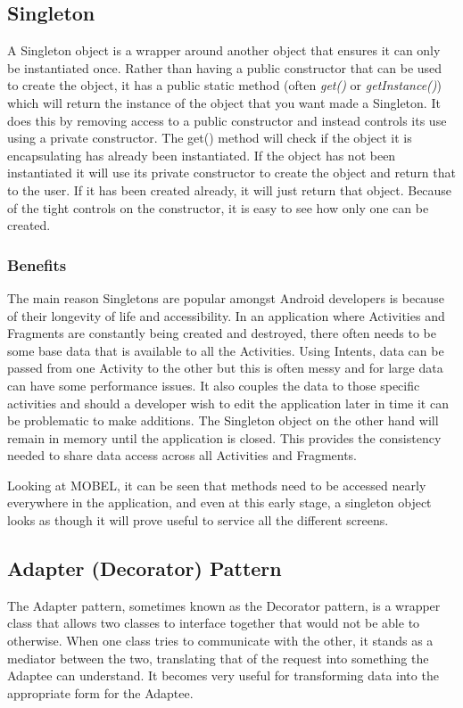\documentclass{l4proj}
\begin{document}
\subsection{Singleton}
A Singleton object is a wrapper around another object that ensures it can only be instantiated once. Rather than having a public constructor that can be used to create the object, it has a public static method (often \textit{get()} or \textit{getInstance()}) which will return the instance of the object that you want made a Singleton.  It does this by removing access to a public constructor and instead controls its use using a private constructor.  The get() method will check if the object it is encapsulating has already been instantiated. If the object has not been instantiated it will use its private constructor to create the object and return that to the user.  If it has been created already, it will just return that object. Because of the tight controls on the constructor, it is easy to see how only one can be created. 

\subsubsection{Benefits}
The main reason Singletons are popular amongst Android developers is because of their longevity of life and accessibility. In an application where Activities and Fragments are constantly being created and destroyed, there often needs to be some base data that is available to all the Activities. Using Intents, data can be passed from one Activity to the other but this is often messy and for large data can have some performance issues.  It also couples the data to those specific activities and should a developer wish to edit the application later in time it can be problematic to make additions.  The Singleton object on the other hand will remain in memory until the application is closed. This provides the consistency needed to share data access across all Activities and Fragments.  

Looking at MOBEL, it can be seen that methods need to be accessed nearly everywhere in the application, and even at this early stage, a singleton object looks as though it will prove useful to service all the different screens. 

\subsection{Adapter (Decorator) Pattern}
The Adapter pattern, sometimes known as the Decorator pattern, is a wrapper class that allows two classes to interface together that would not be able to otherwise. When one class tries to communicate with the other, it stands as a mediator between the two, translating that of the request into something the Adaptee can understand.  It becomes very useful for transforming data into the appropriate form for the Adaptee.
\end{document}
